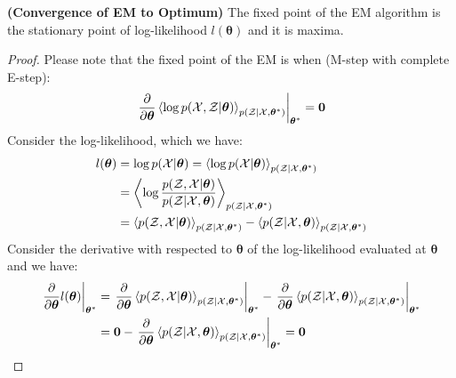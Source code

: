 \begin{theorem}{\textbf{(Convergence of EM to Optimum)}}
    The fixed point of the EM algorithm is the stationary point of log-likelihood $l(\boldsymbol\theta)$ and it is maxima.
\end{theorem}
\begin{proof}
    Please note that the fixed point of the EM is when (M-step with complete E-step):
    \begin{equation*}
        \left. \frac{\partial }{\partial \boldsymbol \theta} \left\langle \log p(\mathcal{X}, \mathcal{Z}| \boldsymbol \theta) \right\rangle_{p(\mathcal{Z} | \mathcal{X}, \boldsymbol \theta^*)}\right|_{\boldsymbol \theta^*} = \boldsymbol 0
    \end{equation*}
    Consider the log-likelihood, which we have:
    \begin{equation*}
    \begin{aligned}
        l(\boldsymbol \theta) &= \log p(\mathcal{X}|\boldsymbol \theta) = \left\langle \log p(\mathcal{X}|\boldsymbol \theta) \right\rangle_{p(\mathcal{Z} | \mathcal{X}, \boldsymbol \theta^*)} \\
        &= \left\langle \log\frac{p(\mathcal{Z}, \mathcal{X} | \boldsymbol \theta)}{p(\mathcal{Z} | \mathcal{X}, \boldsymbol \theta)} \right\rangle_{p(\mathcal{Z} | \mathcal{X}, \boldsymbol \theta^*)} \\
        &= \left\langle  p(\mathcal{Z}, \mathcal{X} | \boldsymbol \theta) \right\rangle_{p(\mathcal{Z} | \mathcal{X}, \boldsymbol \theta^*)} - \left\langle  p(\mathcal{Z} | \mathcal{X}, \boldsymbol \theta)  \right\rangle_{ p(\mathcal{Z} | \mathcal{X}, \boldsymbol \theta^*) } \\
    \end{aligned}
    \end{equation*}
    Consider the derivative with respected to $\boldsymbol \theta$ of the log-likelihood evaluated at $\boldsymbol \theta$ and we have:
    \begin{equation*}
    \begin{aligned}
        \left.\frac{\partial}{\partial \boldsymbol \theta} l(\boldsymbol \theta)\right|_{\boldsymbol \theta^*} &= \left.\frac{\partial}{\partial \boldsymbol \theta} \brackd{ p(\mathcal{Z}, \mathcal{X} | \boldsymbol \theta)}_{p(\mathcal{Z} | \mathcal{X}, \boldsymbol \theta^*)}\right|_{\boldsymbol \theta^*} - \left.\frac{\partial}{\partial \boldsymbol \theta} \brackd{ p(\mathcal{Z} | \mathcal{X}, \boldsymbol \theta) }_{ p(\mathcal{Z} | \mathcal{X}, \boldsymbol \theta^*) }\right|_{\boldsymbol \theta^*} \\
        &= \boldsymbol 0 - \left.\frac{\partial}{\partial \boldsymbol \theta} \brackd{ p(\mathcal{Z} | \mathcal{X}, \boldsymbol \theta) }_{ p(\mathcal{Z} | \mathcal{X}, \boldsymbol \theta^*) }\right|_{\boldsymbol \theta^*} = \boldsymbol 0

\end{aligned}
\end{equation*}
\end{proof}

